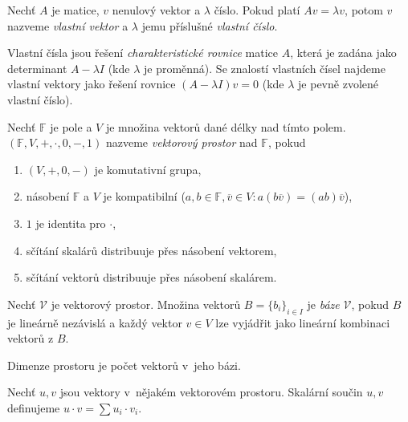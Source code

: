 \begin{definition}
    Nechť $A$ je matice, $v$ nenulový vektor a $\lambda$ číslo.
    Pokud platí $A v = \lambda v$, potom $v$ nazveme {\em vlastní
    vektor} a $\lambda$ jemu příslušné {\em vlastní číslo}.
\end{definition}

Vlastní čísla jsou řešení {\em charakteristické rovnice} matice $A$,
která je zadána jako determinant $A - \lambda I$ (kde $\lambda$ je
proměnná).
Se znalostí vlastních čísel najdeme vlastní vektory jako řešení rovnice
$(A - \lambda I) v = 0$ (kde $\lambda$ je pevně zvolené vlastní číslo).

\begin{definition}
    Nechť $\mathbb{F}$ je pole
    a $V$ je množina vektorů dané délky nad tímto polem.
    $(\mathbb{F}, V, +, \cdot, 0, -, 1)$ nazveme {\em vektorový prostor}
    nad $\mathbb{F}$,
    pokud
    \begin{enumerate}
        \item $(V, +, 0, -)$ je komutativní grupa,
        \item násobení $\mathbb{F}$ a $V$ je kompatibilní
        ($a, b \in \mathbb{F}, \overline{v} \in V : a(b\overline{v}) = (ab)\overline{v}$),
        \item $1$ je identita pro $\cdot$,
        \item sčítání skalárů distribuuje přes násobení vektorem,
        \item sčítání vektorů distribuuje přes násobení skalárem.
    \end{enumerate}
\end{definition}

\begin{definition}
    Nechť $\mathcal{V}$ je vektorový prostor.
    Množina vektorů $B = \{ b_i \}_{i \in I}$ je {\em báze} $\mathcal{V}$,
    pokud $B$ je lineárně nezávislá
    a každý vektor $v \in V$ lze vyjádřit jako lineární kombinaci
    vektorů z $B$.
\end{definition}

\begin{definition}[Dimenze]
    Dimenze prostoru je počet vektorů v~jeho bázi.
\end{definition}

\begin{definition}
    Nechť $u, v$ jsou vektory v~nějakém vektorovém prostoru.
    Skalární součin $u, v$ definujeme
    $u \cdot v = \sum u_i \cdot v_i$.
\end{definition}


